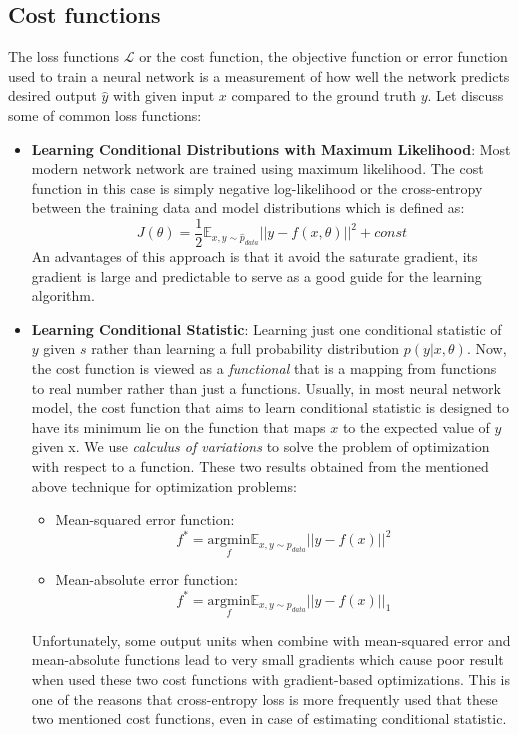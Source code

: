 \subsection{Cost functions}
The loss functions $\mathcal{L}$ or the cost function, the objective function or error function used to train a neural network is a measurement of how well the network predicts desired output $\hat{y}$ with given input $x$ compared to the ground truth $y$. Let discuss some of common loss functions:
\begin{itemize}
    \item \textbf{Learning Conditional Distributions with Maximum Likelihood}:
    Most modern network network are trained using maximum likelihood. The cost function in this case is simply negative log-likelihood or the cross-entropy between the training data and model distributions which is defined as:
    \begin{equation}
        J(\theta) = \frac{1}{2}\mathbb{E}_{x,y\sim\hat{p}_{data}}||y-f(x,\theta)||^2 + const
     \end{equation}
     An advantages of this approach is that it avoid the saturate gradient, its gradient is large and predictable to serve as a good guide for the learning algorithm.
     
     \item \textbf{Learning Conditional Statistic}: Learning just one conditional statistic of $y$ given $s$ rather than learning a full probability distribution $p(y|x,\theta )$. Now, the cost function is viewed as a \textit{functional} that is a mapping from functions to real number rather than just a functions. Usually, in most neural network model, the cost function that aims to learn conditional statistic is designed to have its minimum lie on the function that maps $x$ to the expected value of $y$ given x. We use \textit{calculus of variations} to solve the problem of optimization with respect to a function. These two results obtained from the mentioned above technique for optimization problems:
     \begin{itemize}
         \item Mean-squared error function:
         \begin{equation}
             f^* = \underset{f}{\mathrm{argmin}}\mathbb{E}_{x,y\sim p_{data}}||y-f(x)||^2
         \end{equation}
         \item Mean-absolute error function:
         \begin{equation}
             f^* = \underset{f}{\mathrm{argmin}}\mathbb{E}_{x,y\sim p_{data}}||y-f(x)||_1
         \end{equation}
     \end{itemize}
     Unfortunately, some output units when combine with mean-squared error and mean-absolute functions lead to very small gradients which cause poor result when used these two cost functions with gradient-based optimizations. This is one of the reasons that cross-entropy loss is more frequently used that these two mentioned cost functions, even in case of estimating conditional statistic. 
\end{itemize}
